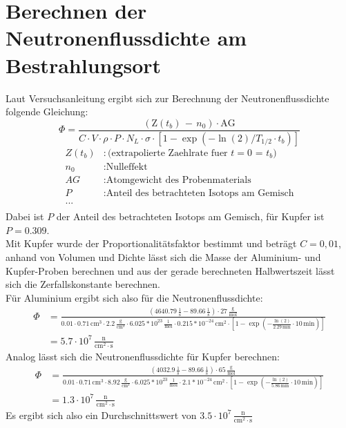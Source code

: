 \documentclass[12pt,german]{article}
\begin{document}
    \section{Berechnen der Neutronenflussdichte am Bestrahlungsort}
    Laut Versuchsanleitung ergibt sich zur Berechnung der Neutronenflussdichte folgende Gleichung:
    \begin{equation*}
        \Phi = \frac{\left(\text{Z}(t_b)\, -\, n_0\right) \cdot \text{AG}}{C \cdot V \cdot \rho \cdot P \cdot N_L \cdot \sigma \cdot \left[1 - \exp(-\ln(2)/T_{1/2} \cdot t_b)\right]}
    \end{equation*}
    \begin{align*}
		Z(t_b) &: \text{(extrapolierte Zaehlrate fuer $t = 0$ = $t_b$)} \\
		n_0 &: \text{Nulleffekt} \\
		AG &: \text{Atomgewicht des Probenmaterials} \\
		P &: \text{Anteil des betrachteten Isotops am Gemisch} \\
		... \\
	\end{align*}
	Dabei ist $P$ der Anteil des betrachteten Isotops am Gemisch, für Kupfer ist $P = 0.309$. \\
    Mit Kupfer wurde der Proportionalitätsfaktor bestimmt und beträgt $C = 0,01$, anhand von Volumen und Dichte lässt sich die Masse der Aluminium- und Kupfer-Proben berechnen und aus der gerade berechneten Halbwertszeit lässt sich die Zerfallskonstante berechnen. \\
    Für Aluminium ergibt sich also für die Neutronenflussdichte:
    \begin{align*}
        \Phi &= \frac{\left(4640.79\, \frac{1}{\text{s}} - 89.66\, \frac{1}{\text{s}}\right) \cdot 27\, \frac{\text{g}}{\text{mol}}}{0.01 \cdot 0.71\, \text{cm}^3 \cdot 2.2\, \frac{\text{g}}{\text{cm}^3} \cdot 6.025 * 10^{23}\, \frac{1}{\text{mol}} \cdot 0.215 * 10^{-24}\, \text{cm}^2 \cdot \left[1 - \exp\left(- \frac{\ln(2)}{2.29\, \text{min}} \cdot 10\, \text{min}\right)\right]} \\
             &= 5.7 \cdot 10^7\, \frac{\text{n}}{\text{cm}^2 \cdot \text{s}}
    \end{align*}
    Analog lässt sich die Neutronenflussdichte für Kupfer berechnen:
    \begin{align*}
        \Phi &= \frac{\left(4032.9\, \frac{1}{\text{s}} - 89.66\, \frac{1}{\text{s}}\right) \cdot 65\, \frac{\text{g}}{\text{mol}}}{0.01 \cdot 0.71\, \text{cm}^3 \cdot 8.92\, \frac{\text{g}}{\text{cm}^3} \cdot 6.025 * 10^{23}\, \frac{1}{\text{mol}} \cdot 2.1 * 10^{-24}\, \text{cm}^2 \cdot \left[1 - \exp\left(- \frac{\ln(2)}{5.86\, \text{min}} \cdot 10\, \text{min}\right)\right]} \\
             &= 1.3 \cdot 10^7\, \frac{\text{n}}{\text{cm}^2 \cdot \text{s}}
    \end{align*}
    Es ergibt sich also ein Durchschnittswert von $3.5 \cdot 10^7\, \frac{\text{n}}{\text{cm}^2 \cdot \text{s}}$
\end{document}
